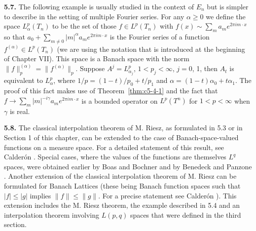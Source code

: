 \textbf{5.7.} The following example is usually studied in the context of
$E_{n}$ but is simpler to describe in the setting of multiple Fourier series.
For any $\alpha \geq 0$ we define the space $L_{\alpha}^{p}(T_{n})$ to be the
set of those $f \in L^{p}(T_{n})$ with
$f(x) \sim \sum_{m}a_{m}e^{2\pi im \cdot x}$ so that
$a_{0} + \sum_{m \neq 0}|m|^{\alpha}a_{m}e^{2\pi im \cdot x}$ is the Fourier
series of a function $f^{(\alpha)} \in L^{p}(T_{n})$ (we are using the
notation that is introduced at the beginning of Chapter VII). This space is a
Banach space with the norm $\|f\|_{p}^{(\alpha)} = \|f^{(\alpha)}\|_{p}$.
Suppose $A^{j} = L_{\alpha_{j}}^{p}$, $1 < p_{j} < \infty$, $j = 0$, 1, then
$A_{t}$ is equivalent to $L_{\alpha}^{p}$, where
$1/p = (1 - t)/p_{0} + t/p_{1}$ and $\alpha = (1 - t)\alpha_{0} + t\alpha_{1}$.
The proof of this fact makes use of Theorem~\ref{thm:c5-4-1} and the fact that
$f \to \sum_{m}|m|^{-i\gamma}a_{m}e^{2\pi im \cdot x}$ is a bounded operator on
$L^{p}(T^{n})$ for $1 < p < \infty$ when $\gamma$ is real.

\textbf{5.8.} The classical interpolation theorem of M. Riesz, as formulated
in 5.3 or in Section 1 of this chapter, can be extended to the case of
Banach-space-valued functions on a measure space. For a detailed statement of
this result, see Calder\'on \cite{Calderon2}. Special cases, where the values
of the functions are themselves $L^{q}$ spaces, were obtained earlier by Boas
and Bochner \cite{BoasBochner1} and by Benedeck and Panzone
\cite{BenedekPanzone1}. Another extension of the classical interpolation
theorem of M. Riesz can be formulated for Banach Lattices (these being Banach
function spaces such that $|f| \leq |g|$ implies $\|f\| \leq \|g\|$. For a
precise statement see Calder\'on \cite{Calderon2}). This extension includes the
M. Riesz theorem, the example described in 5.4 and an interpolation theorem
involving $L(p, q)$ spaces that were defined in the third section.

